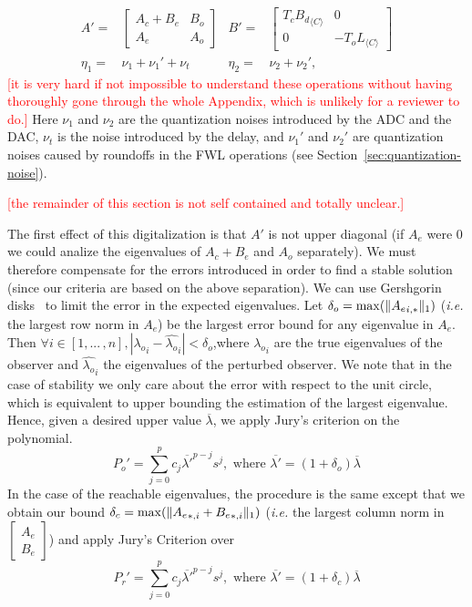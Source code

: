\documentclass[sigconf]{llncs}
\DeclarePairedDelimiter\norm{\lVert}{\rVert}
\newcommand{\mat}[1]{{#1}}
\renewcommand{\note}[1]{\textcolor{red}{[#1]}}
\begin{document}
{\setlength{\abovedisplayskip}{0pt}
\begin{align*}
\mat{A}'=&\left [\begin{array}{cc}\mat{A}_{c}+\mat{B}_{e}&\mat{B}_{o}\\ \mat{A}_{e}&\mat{A}_{o}\end{array}\right]&
\mat{B}'=&\left[\begin{array}{cc}\mat{T}_c{\mat{B}_d}_{\langle C \rangle}&\mat{0}\\\mat{0}&-\mat{T}_o\mat{L}_{\langle C \rangle}\end{array}\right]\\
\eta_1=&\nu_1+\nu_1'+\nu_t& \eta_2=&\nu_2+\nu_2',
\end{align*}
}
\note{it is very hard if not impossible to understand these operations without having thoroughly gone through the whole Appendix, which is unlikely for a reviewer to do.}
Here $\nu_1$ and $\nu_2$ are the quantization noises introduced by the ADC and the DAC, $\nu_t$ is the noise introduced by the delay, and $\nu_1'$ and $\nu_2'$ are quantization noises caused by roundoffs in the FWL operations (see Section~\ref{sec:quantization-noise}).

\note{the remainder of this section is not self contained and totally unclear.}

The first effect of this digitalization is that $\mat{A}'$ is not upper
diagonal (if $\mat{A}_e$ were $0$ we could analize the eigenvalues of $\mat{A}_c+\mat{B}_e$ and $\mat{A}_o$ separately).
We must therefore compensate for the errors introduced in order
to find a stable solution (since our criteria are based on the above separation).  
We can use Gershgorin disks~\cite{van1996matrix} to limit the error
in the expected eigenvalues.  Let $\delta_o=\max(\norm{{\mat{A}_e}_{i,*}}_1)$
(\emph{i.e.} the largest row norm in $\mat{A}_e$) be the largest error bound
for any eigenvalue in $\mat{A}_e$.  Then $\forall i \in [1, ...\,,n],
|{\lambda_o}_{i}-\hat{\lambda_o}_{i}|<\delta_o$,where ${\lambda_o}_{i}$ are the
true eigenvalues of the observer and $\hat{\lambda_o}_{i}$ the eigenvalues of
the perturbed observer.  We note that in the case of stability we only care
about the error with respect to the unit circle, which is equivalent to
upper bounding the estimation of the largest eigenvalue.  Hence, given a
desired upper value $\overline{\lambda}$, we apply Jury's criterion on the
polynomial.
%
\begin{equation}
P_o'=\sum_{j=0}^p c_j\overline{\lambda'}^{p-j}s^j, \text{ where }  \overline{\lambda'}=(1+\delta_o)\overline{\lambda}
\end{equation}
%
In the case of the reachable eigenvalues, the procedure is the same except
that we obtain our bound $\delta_c=\max(\norm{{\mat{A}_e}_{*,i}+{\mat{B}_e}_{*,i}}_1)$
(\emph{i.e.} the largest column norm in $ \left[\begin{array}{c}\mat{A}_e\\ \mat{B}_e\end{array}\right]$) and
apply Jury's Criterion over
%
\begin{equation}
P_r'=\sum_{j=0}^p c_j\overline{\lambda'}^{p-j}s^j, \text{ where }  \overline{\lambda'}=(1+\delta_c)\overline{\lambda}
\end{equation}
\end{document}
